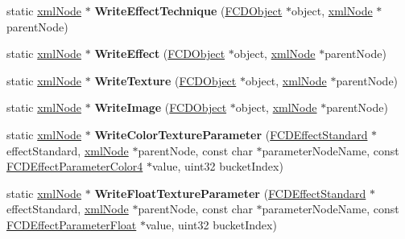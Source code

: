 \begin{DoxyCompactItemize}
\item 
\hypertarget{classFArchiveXML_ace2d8adb4c64a3d88025961559a3b384}{
static \hyperlink{struct__xmlNode}{xmlNode} $\ast$ {\bfseries WriteEffectTechnique} (\hyperlink{classFCDObject}{FCDObject} $\ast$object, \hyperlink{struct__xmlNode}{xmlNode} $\ast$parentNode)}
\label{classFArchiveXML_ace2d8adb4c64a3d88025961559a3b384}

\item 
\hypertarget{classFArchiveXML_a57a0a0e7e147ad980c65b0fe5b664a84}{
static \hyperlink{struct__xmlNode}{xmlNode} $\ast$ {\bfseries WriteEffect} (\hyperlink{classFCDObject}{FCDObject} $\ast$object, \hyperlink{struct__xmlNode}{xmlNode} $\ast$parentNode)}
\label{classFArchiveXML_a57a0a0e7e147ad980c65b0fe5b664a84}

\item 
\hypertarget{classFArchiveXML_a4900426f253f5d3e6a727b29d89dfe95}{
static \hyperlink{struct__xmlNode}{xmlNode} $\ast$ {\bfseries WriteTexture} (\hyperlink{classFCDObject}{FCDObject} $\ast$object, \hyperlink{struct__xmlNode}{xmlNode} $\ast$parentNode)}
\label{classFArchiveXML_a4900426f253f5d3e6a727b29d89dfe95}

\item 
\hypertarget{classFArchiveXML_a3f29e73a10d24e2f5789eca954b69657}{
static \hyperlink{struct__xmlNode}{xmlNode} $\ast$ {\bfseries WriteImage} (\hyperlink{classFCDObject}{FCDObject} $\ast$object, \hyperlink{struct__xmlNode}{xmlNode} $\ast$parentNode)}
\label{classFArchiveXML_a3f29e73a10d24e2f5789eca954b69657}

\item 
\hypertarget{classFArchiveXML_a7bbad1ce83cb804ea01f1777db4c83c4}{
static \hyperlink{struct__xmlNode}{xmlNode} $\ast$ {\bfseries WriteColorTextureParameter} (\hyperlink{classFCDEffectStandard}{FCDEffectStandard} $\ast$effectStandard, \hyperlink{struct__xmlNode}{xmlNode} $\ast$parentNode, const char $\ast$parameterNodeName, const \hyperlink{classFCDEffectParameterAnimatableT}{FCDEffectParameterColor4} $\ast$value, uint32 bucketIndex)}
\label{classFArchiveXML_a7bbad1ce83cb804ea01f1777db4c83c4}

\item 
\hypertarget{classFArchiveXML_ad9620a4f4f9e23df04cca778ff391679}{
static \hyperlink{struct__xmlNode}{xmlNode} $\ast$ {\bfseries WriteFloatTextureParameter} (\hyperlink{classFCDEffectStandard}{FCDEffectStandard} $\ast$effectStandard, \hyperlink{struct__xmlNode}{xmlNode} $\ast$parentNode, const char $\ast$parameterNodeName, const \hyperlink{classFCDEffectParameterAnimatableT}{FCDEffectParameterFloat} $\ast$value, uint32 bucketIndex)}
\label{classFArchiveXML_ad9620a4f4f9e23df04cca778ff391679}


\end{DoxyCompactItemize}
